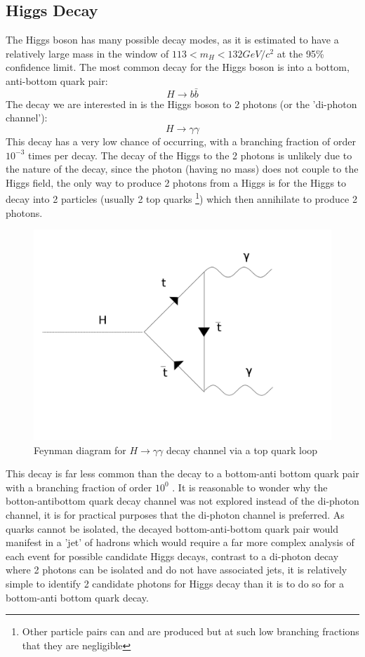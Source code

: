 \documentclass{article}
\begin{document}
\subsection{Higgs Decay}
The Higgs boson has many possible decay modes, as it is estimated to have a relatively large mass in the window of $113 < m_H < 132 GeV/c^2$ at the 95\% confidence limit. The most common decay for the Higgs boson is into a bottom, anti-bottom quark pair:
\begin{equation}
H \rightarrow b \bar{b}
\end{equation}
The decay we are interested in is the Higgs boson to 2 photons (or the 'di-photon channel'):
\begin{equation}
H \rightarrow \gamma \gamma
\end{equation}
\cite{HiggsdecayEMback}
This decay has a very low chance of occurring, with a branching fraction of order $10^{-3}$ times per decay. \cite[p.~5]{HiggsCross3} The decay of the Higgs to the 2 photons is unlikely due to the nature of the decay, since the photon (having no mass) does not couple to the Higgs field, the only way to produce 2 photons from a Higgs is for the Higgs to decay into 2 particles (usually 2 top quarks \footnote{Other particle pairs can and are produced but at such low branching fractions that they are negligible}) which then annihilate to produce 2 photons. 
\begin{figure}
\includegraphics[scale=0.25]{Hyy}
\caption{Feynman diagram for $H \rightarrow \gamma \gamma$ decay channel via a top quark loop}
\end{figure}
This decay is far less common than the decay to a bottom-anti bottom quark pair with a branching fraction of order $10^{0}$ \cite[p.~5]{HiggsCross3}. It is reasonable to wonder why the botton-antibottom quark decay channel was not explored instead of the di-photon channel, it is for practical purposes that the di-photon channel is preferred. As quarks cannot be isolated, the decayed bottom-anti-bottom quark pair would manifest in a 'jet' of hadrons which would require a far more complex analysis of each event for possible candidate Higgs decays, contrast to a di-photon decay where 2 photons can be isolated and do not have associated jets, it is relatively simple to identify 2 candidate photons for Higgs decay than it is to do so for a bottom-anti bottom quark decay. 
\end{document}
